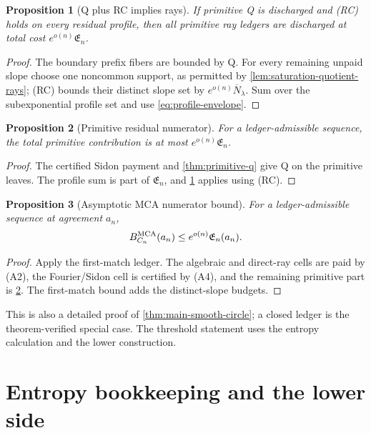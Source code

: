 \documentclass[12pt,a4paper]{amsart}
\numberwithin{equation}{section}
\newtheorem{proposition}[proposition]{Proposition}
\theoremstyle{remark}
\newcommand{\barN}{\overline N}
\begin{document}
\begin{proposition}[Q plus RC implies rays]\label{prop:q-implies-sp}
If primitive Q is discharged and \textup{(RC)} holds on every residual
profile, then all primitive ray ledgers are discharged
at total cost \(e^{o(n)}\mathfrak E_n\).
\end{proposition}

\begin{proof}
The boundary prefix fibers are bounded by Q.  For every remaining unpaid
slope choose one noncommon support, as permitted by
\cref{lem:saturation-quotient-rays}; \textup{(RC)} bounds their distinct slope set by
\(e^{o(n)}\barN_\lambda\).  Sum over the subexponential profile set and use
\eqref{eq:profile-envelope}.
\end{proof}

\begin{proposition}[Primitive residual numerator]\label{prop:primitive-residual-numerator}
For a ledger-admissible sequence, the total primitive contribution is at
most \(e^{o(n)}\mathfrak E_n\).
\end{proposition}

\begin{proof}
The certified Sidon payment and \cref{thm:primitive-q} give Q on the
primitive leaves.  The profile sum is part of \(\mathfrak E_n\), and
\cref{prop:q-implies-sp} applies using \textup{(RC)}.
\end{proof}

\begin{proposition}[Asymptotic MCA numerator bound]\label{prop:numerator-bound}
For a ledger-admissible sequence at agreement \(a_n\),
\[
        B_{C_n}^{\rm MCA}(a_n)
        \le e^{o(n)}\mathfrak E_n(a_n).
\]
\end{proposition}

\begin{proof}
Apply the first-match ledger.  The algebraic and direct-ray cells are paid by
\textup{(A2)}, the Fourier/Sidon cell is certified by \textup{(A4)}, and the remaining primitive
part is \cref{prop:primitive-residual-numerator}.  The first-match bound
adds the distinct-slope budgets.
\end{proof}

This is also a detailed proof of \cref{thm:main-smooth-circle}; a closed
ledger is the theorem-verified special case.  The threshold statement uses
the entropy calculation and the lower construction.

\section{Entropy bookkeeping and the lower side}\label{sec:frontier}
\end{document}
